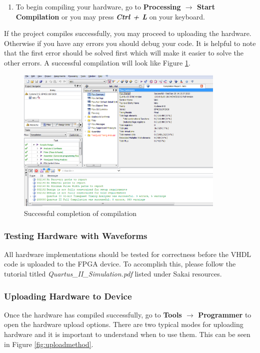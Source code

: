 \begin{enumerate}

	\item To begin compiling your hardware, go to {\bf Processing $\rightarrow$ Start Compilation} or you may press {\bf \emph{Ctrl + L}} on your keyboard.

\end{enumerate}

If the project compiles successfully, you may proceed to uploading the hardware. Otherwise if you have any errors you should debug your code. It is helpful to note that the first error should be solved first which will make it easier to solve the other errors. A successful compilation will look like Figure \ref{fig:compileresuts}.

\begin{figure}[H]
	\centering
	\includegraphics[width=100mm]{Lab1/figures/compileresults.png}
	\caption{Successful completion of compilation}
	\label{fig:compileresuts}
\end{figure}

\subsubsection{Testing Hardware with Waveforms}

All hardware
implementations should be tested for correctness before the VHDL code is uploaded to the FPGA device. To accomplish this, please follow the tutorial titled \emph{Quartus\_II\_Simulation.pdf} listed under Sakai resources.

\subsubsection{Uploading Hardware to Device}

Once the hardware has compiled successfully, go to {\bf Tools $\rightarrow$ Programmer} to open the hardware upload options. There are two typical modes for uploading hardware and it is important to understand when to use them. This can be seen in Figure \ref{fig:uploadmethod}.


